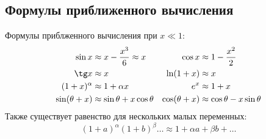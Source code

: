 \subsection{Формулы приближенного вычисления}
Формулы приблженного вычисления при $x \ll 1$:
\begin{align*}
	\sin x &\approx x - \frac{x^3}{6} \approx x & \cos x &\approx 1 - \frac{x^2}{2} \\
	\tg x &\approx x & \ln(1+x) &\approx x \\
	(1 + x)^\alpha &\approx 1 + \alpha x & e^x &\approx 1 + x \\
	\sin (\theta + x) &\approx \sin \theta + x \cos \theta & \cos(\theta + x) &\approx \cos \theta - x \sin \theta
\end{align*}
Также существует равенство для нескольких малых переменных:
\begin{equation*}
	(1 + a)^\alpha (1 + b)^\beta \ldots \approx 1 + \alpha a + \beta b + \ldots
\end{equation*}
